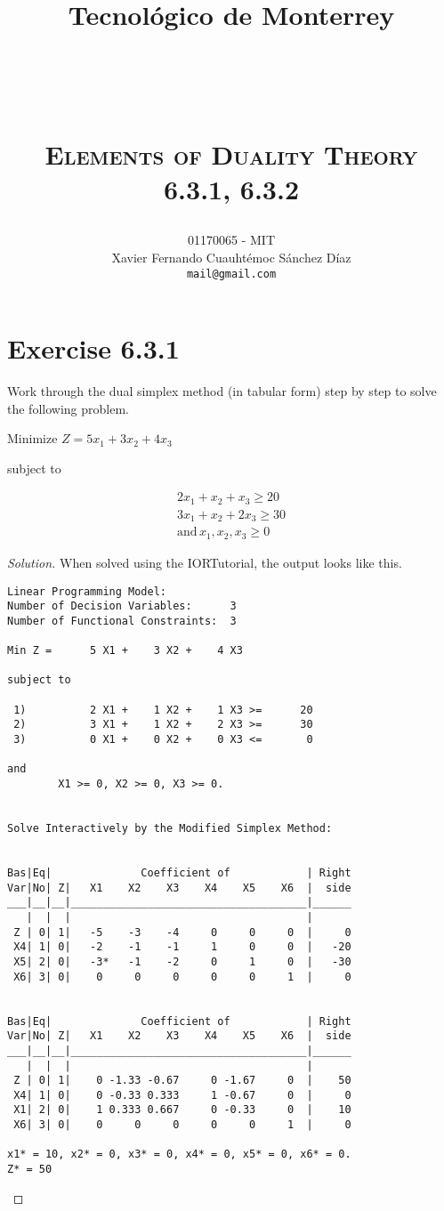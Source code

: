 \documentclass[titlepage, letterpaper, fleqn]{article}
\title{
\vspace{1in}
\textbf{Tecnológico de Monterrey} \\
\vspace{0.5in}
\textmd{\mahclass} \\
\large{\textit{\mahteacher}} \\
\vspace{0.5in}
\textsc{\mahtitle}\\
\textsc{Elements of Duality Theory}\\
\textsc{6.3.1, 6.3.2}\\
\author{01170065  - MIT \\
Xavier Fernando Cuauhtémoc Sánchez Díaz \\
\texttt{mail@gmail.com}}
\date{\mahdate}
}
\renewcommand\qedsymbol{\(\blacksquare\)}
\newenvironment{solution}
{\renewcommand\qedsymbol{$\square$}\begin{proof}[Solution]}
{\end{proof}}
\begin{document}
\begin{titlepage}
\maketitle
\end{titlepage}

%
%

\section{Exercise 6.3.1}

{\large Work through the dual simplex method (in tabular form) step by step to solve the following problem.

Minimize $Z = 5x_1 + 3x_2 + 4x_3$

subject to

\begin{align*}
    2x_1 + x_2 + x_3 \geq 20 \\
    3x_1 + x_2 + 2x_3 \geq 30 \\
    \text{and} \, x_1, x_2, x_3 \geq 0
\end{align*}}

\begin{solution}
When solved using the IORTutorial, the output looks like this.
\begin{lstlisting}[basicstyle=\tiny]
Linear Programming Model:
Number of Decision Variables:      3
Number of Functional Constraints:  3

Min Z =      5 X1 +    3 X2 +    4 X3 

subject to

 1)          2 X1 +    1 X2 +    1 X3 >=      20
 2)          3 X1 +    1 X2 +    2 X3 >=      30
 3)          0 X1 +    0 X2 +    0 X3 <=       0

and
        X1 >= 0, X2 >= 0, X3 >= 0.


Solve Interactively by the Modified Simplex Method:


Bas|Eq|              Coefficient of            | Right
Var|No| Z|   X1    X2    X3    X4    X5    X6  |  side
___|__|__|_____________________________________|______
   |  |  |                                     | 
 Z | 0| 1|   -5    -3    -4     0     0     0  |     0
 X4| 1| 0|   -2    -1    -1     1     0     0  |   -20
 X5| 2| 0|   -3*   -1    -2     0     1     0  |   -30
 X6| 3| 0|    0     0     0     0     0     1  |     0


Bas|Eq|              Coefficient of            | Right
Var|No| Z|   X1    X2    X3    X4    X5    X6  |  side
___|__|__|_____________________________________|______
   |  |  |                                     | 
 Z | 0| 1|    0 -1.33 -0.67     0 -1.67     0  |    50
 X4| 1| 0|    0 -0.33 0.333     1 -0.67     0  |     0
 X1| 2| 0|    1 0.333 0.667     0 -0.33     0  |    10
 X6| 3| 0|    0     0     0     0     0     1  |     0

x1* = 10, x2* = 0, x3* = 0, x4* = 0, x5* = 0, x6* = 0.
Z* = 50

\end{lstlisting}
\end{solution}
\end{document}
